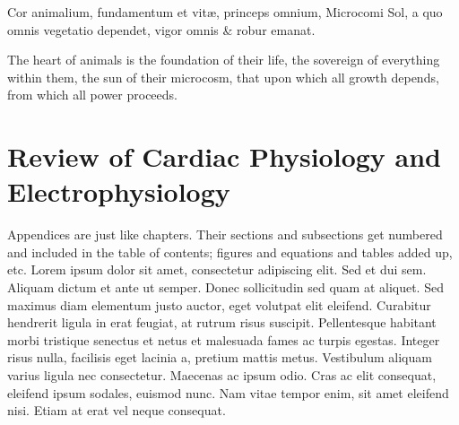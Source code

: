 \begin{savequote}[8cm]
\textlatin{Cor animalium, fundamentum e\longs t vitæ, princeps omnium, Microco\longs mi Sol, a quo omnis vegetatio dependet, vigor omnis \& robur emanat.}

The heart of animals is the foundation of their life, the sovereign of everything within them, the sun of their microcosm, that upon which all growth depends, from which all power proceeds.
\end{savequote}

\chapter{\label{app:1-cardiophys}Review of Cardiac Physiology and Electrophysiology}

\minitoc

Appendices are just like chapters.  Their sections and subsections get numbered and included in the table of contents; figures and equations and tables added up, etc.  Lorem ipsum dolor sit amet, consectetur adipiscing elit. Sed et dui sem. Aliquam dictum et ante ut semper. Donec sollicitudin sed quam at aliquet. Sed maximus diam elementum justo auctor, eget volutpat elit eleifend. Curabitur hendrerit ligula in erat feugiat, at rutrum risus suscipit. Pellentesque habitant morbi tristique senectus et netus et malesuada fames ac turpis egestas. Integer risus nulla, facilisis eget lacinia a, pretium mattis metus. Vestibulum aliquam varius ligula nec consectetur. Maecenas ac ipsum odio. Cras ac elit consequat, eleifend ipsum sodales, euismod nunc. Nam vitae tempor enim, sit amet eleifend nisi. Etiam at erat vel neque consequat.


